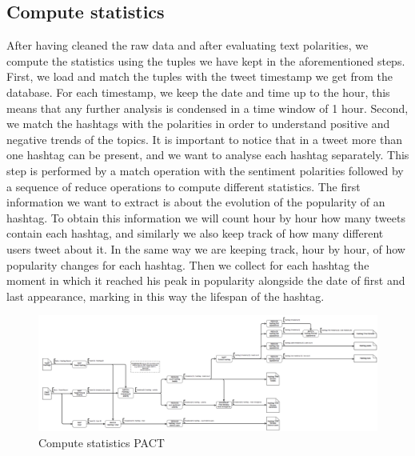 \subsection{Compute statistics}
\label{sec:statistics}
After having cleaned the raw data and after evaluating text polarities, we compute the statistics using the tuples we have kept in the aforementioned steps. 
First, we load and match the tuples with the tweet timestamp we get from the database.
For each timestamp, we  keep the date and time up to the hour, this means that any further analysis is condensed in a time window of 1 hour.
Second, we match the hashtags with the polarities in order to understand positive and negative trends of the topics. 
It is important to notice that in a tweet more than one hashtag can be present, and we want to analyse each hashtag separately.
This step is performed by a match operation with the sentiment polarities followed by a sequence of reduce operations to compute different statistics.
The first information we want to extract is about the evolution of the popularity of an hashtag.
To obtain this information we will count hour by hour how many tweets contain each hashtag, and similarly we also keep track of how many different users tweet about it.
In the same way we are keeping track, hour by hour, of how popularity changes for each hashtag.
Then we collect for each hashtag the moment in which it reached his peak in popularity alongside the date of first and last appearance, marking in this way the lifespan of the hashtag.



\begin{figure}[ht]
\includegraphics[width=\textwidth]{images/strato_pact_pt2.png} 
\caption{Compute statistics PACT}
\label{fig:statistics}
\end{figure}
